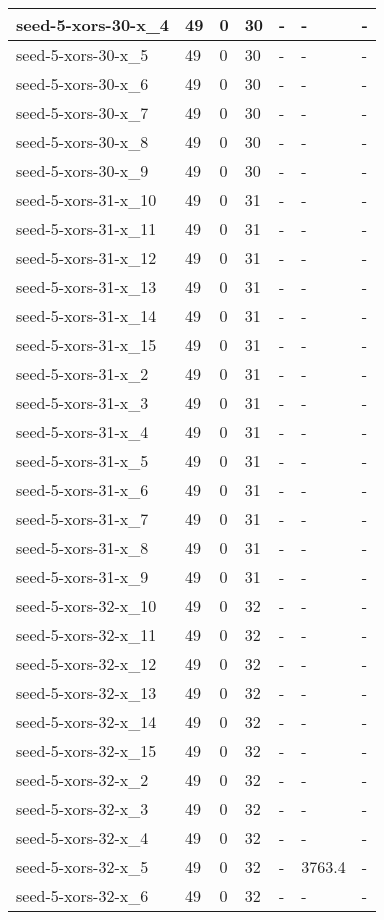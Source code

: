 \begin{scriptsize}
\begin{longtable}{|p{5cm}|l|l|l|l|l|l|}
seed-5-xors-30-x\_4&49&0&30&-&-&- \\ \hline 
seed-5-xors-30-x\_5&49&0&30&-&-&- \\ \hline 
seed-5-xors-30-x\_6&49&0&30&-&-&- \\ \hline 
seed-5-xors-30-x\_7&49&0&30&-&-&- \\ \hline 
seed-5-xors-30-x\_8&49&0&30&-&-&- \\ \hline 
seed-5-xors-30-x\_9&49&0&30&-&-&- \\ \hline 
seed-5-xors-31-x\_10&49&0&31&-&-&- \\ \hline 
seed-5-xors-31-x\_11&49&0&31&-&-&- \\ \hline 
seed-5-xors-31-x\_12&49&0&31&-&-&- \\ \hline 
seed-5-xors-31-x\_13&49&0&31&-&-&- \\ \hline 
seed-5-xors-31-x\_14&49&0&31&-&-&- \\ \hline 
seed-5-xors-31-x\_15&49&0&31&-&-&- \\ \hline 
seed-5-xors-31-x\_2&49&0&31&-&-&- \\ \hline 
seed-5-xors-31-x\_3&49&0&31&-&-&- \\ \hline 
seed-5-xors-31-x\_4&49&0&31&-&-&- \\ \hline 
seed-5-xors-31-x\_5&49&0&31&-&-&- \\ \hline 
seed-5-xors-31-x\_6&49&0&31&-&-&- \\ \hline 
seed-5-xors-31-x\_7&49&0&31&-&-&- \\ \hline 
seed-5-xors-31-x\_8&49&0&31&-&-&- \\ \hline 
seed-5-xors-31-x\_9&49&0&31&-&-&- \\ \hline 
seed-5-xors-32-x\_10&49&0&32&-&-&- \\ \hline 
seed-5-xors-32-x\_11&49&0&32&-&-&- \\ \hline 
seed-5-xors-32-x\_12&49&0&32&-&-&- \\ \hline 
seed-5-xors-32-x\_13&49&0&32&-&-&- \\ \hline 
seed-5-xors-32-x\_14&49&0&32&-&-&- \\ \hline 
seed-5-xors-32-x\_15&49&0&32&-&-&- \\ \hline 
seed-5-xors-32-x\_2&49&0&32&-&-&- \\ \hline 
seed-5-xors-32-x\_3&49&0&32&-&-&- \\ \hline 
seed-5-xors-32-x\_4&49&0&32&-&-&- \\ \hline 
seed-5-xors-32-x\_5&49&0&32&-&3763.4&- \\ \hline 
seed-5-xors-32-x\_6&49&0&32&-&-&- \\ \hline 

\end{longtable}
\end{scriptsize}
